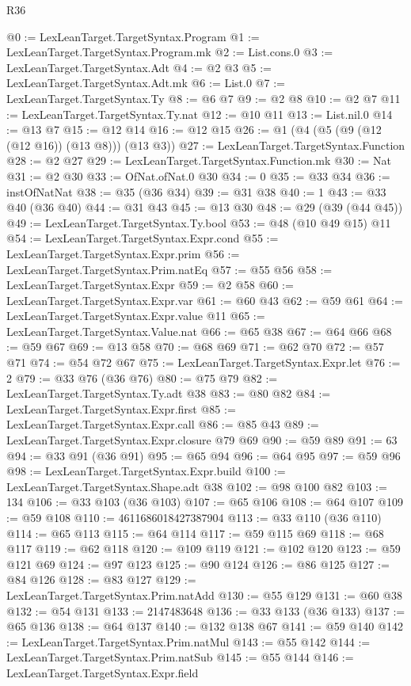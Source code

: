 \begin{lexlean}{R36}
\begin{coremodule}
@0 := LexLeanTarget.TargetSyntax.Program
@1 := LexLeanTarget.TargetSyntax.Program.mk
@2 := List.cons.{0}
@3 := LexLeanTarget.TargetSyntax.Adt
@4 := @2 @3
@5 := LexLeanTarget.TargetSyntax.Adt.mk
@6 := List.{0}
@7 := LexLeanTarget.TargetSyntax.Ty
@8 := @6 @7
@9 := @2 @8
@10 := @2 @7
@11 := LexLeanTarget.TargetSyntax.Ty.nat
@12 := @10 @11
@13 := List.nil.{0}
@14 := @13 @7
@15 := @12 @14
@16 := @12 @15
@26 := @1 (@4 (@5 (@9 (@12 (@12 @16)) (@13 @8))) (@13 @3))
@27 := LexLeanTarget.TargetSyntax.Function
@28 := @2 @27
@29 := LexLeanTarget.TargetSyntax.Function.mk
@30 := Nat
@31 := @2 @30
@33 := OfNat.ofNat.{0} @30
@34 := 0
@35 := @33 @34
@36 := instOfNatNat
@38 := @35 (@36 @34)
@39 := @31 @38
@40 := 1
@43 := @33 @40 (@36 @40)
@44 := @31 @43
@45 := @13 @30
@48 := @29 (@39 (@44 @45))
@49 := LexLeanTarget.TargetSyntax.Ty.bool
@53 := @48 (@10 @49 @15) @11
@54 := LexLeanTarget.TargetSyntax.Expr.cond
@55 := LexLeanTarget.TargetSyntax.Expr.prim
@56 := LexLeanTarget.TargetSyntax.Prim.natEq
@57 := @55 @56
@58 := LexLeanTarget.TargetSyntax.Expr
@59 := @2 @58
@60 := LexLeanTarget.TargetSyntax.Expr.var
@61 := @60 @43
@62 := @59 @61
@64 := LexLeanTarget.TargetSyntax.Expr.value @11
@65 := LexLeanTarget.TargetSyntax.Value.nat
@66 := @65 @38
@67 := @64 @66
@68 := @59 @67
@69 := @13 @58
@70 := @68 @69
@71 := @62 @70
@72 := @57 @71
@74 := @54 @72 @67
@75 := LexLeanTarget.TargetSyntax.Expr.let
@76 := 2
@79 := @33 @76 (@36 @76)
@80 := @75 @79
@82 := LexLeanTarget.TargetSyntax.Ty.adt @38
@83 := @80 @82
@84 := LexLeanTarget.TargetSyntax.Expr.first
@85 := LexLeanTarget.TargetSyntax.Expr.call
@86 := @85 @43
@89 := LexLeanTarget.TargetSyntax.Expr.closure @79 @69
@90 := @59 @89
@91 := 63
@94 := @33 @91 (@36 @91)
@95 := @65 @94
@96 := @64 @95
@97 := @59 @96
@98 := LexLeanTarget.TargetSyntax.Expr.build
@100 := LexLeanTarget.TargetSyntax.Shape.adt @38
@102 := @98 @100 @82
@103 := 134
@106 := @33 @103 (@36 @103)
@107 := @65 @106
@108 := @64 @107
@109 := @59 @108
@110 := 4611686018427387904
@113 := @33 @110 (@36 @110)
@114 := @65 @113
@115 := @64 @114
@117 := @59 @115 @69
@118 := @68 @117
@119 := @62 @118
@120 := @109 @119
@121 := @102 @120
@123 := @59 @121 @69
@124 := @97 @123
@125 := @90 @124
@126 := @86 @125
@127 := @84 @126
@128 := @83 @127
@129 := LexLeanTarget.TargetSyntax.Prim.natAdd
@130 := @55 @129
@131 := @60 @38
@132 := @54 @131
@133 := 2147483648
@136 := @33 @133 (@36 @133)
@137 := @65 @136
@138 := @64 @137
@140 := @132 @138 @67
@141 := @59 @140
@142 := LexLeanTarget.TargetSyntax.Prim.natMul
@143 := @55 @142
@144 := LexLeanTarget.TargetSyntax.Prim.natSub
@145 := @55 @144
@146 := LexLeanTarget.TargetSyntax.Expr.field

\end{coremodule}
\end{lexlean}
